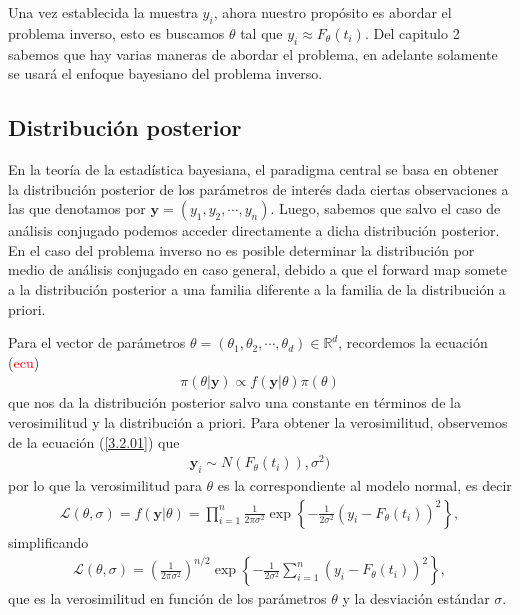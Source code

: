 Una vez establecida la muestra $y_i$, ahora nuestro propósito es abordar el problema inverso, esto es buscamos $\theta$ tal que $y_i \approx F_{\theta}(t_i)$. Del capitulo 2 sabemos que hay varias maneras de abordar el problema, en adelante solamente se usará el enfoque bayesiano del problema inverso.

\subsection{Distribución posterior}

En la teoría de la estadística bayesiana, el paradigma central se basa en obtener la distribución posterior de los parámetros de interés dada ciertas observaciones a las que denotamos por $\mathbf{y} = (y_1,y_2,\cdots, y_n)$. Luego, sabemos que salvo el caso de análisis conjugado podemos acceder directamente a dicha distribución posterior. En el caso del problema inverso no es posible determinar la distribución por medio de análisis conjugado en caso general, debido a que el forward map somete a la distribución posterior a una familia diferente a la familia de la distribución a priori.

Para el vector de parámetros $\theta = (\theta_1,\theta_2, \cdots, \theta_d) \in \mathbb{R}^d$, recordemos la ecuación (\textcolor{red}{ecu}) 
\begin{align}
    \pi(\theta|\mathbf{y}) \propto f(\mathbf{y}|\theta) \pi(\theta)
    \label{3.2.1.01}
\end{align} 
que nos da la distribución posterior salvo una constante en términos de la verosimilitud y la distribución a priori. Para obtener la verosimilitud, observemos de la ecuación (\ref{3.2.01}) que 
\begin{align*}
    \mathbf{y}_i \sim N(F_{\theta}(t_i)), \sigma^2)
\end{align*}
por lo que la verosimilitud para $\theta$ es la correspondiente al modelo normal, es decir
\begin{align}
    \mathcal{L} (\theta,\sigma) = f(\mathbf{y}|\theta) = \prod_{i = 1}^{n} \frac{1}{2\pi \sigma^2} \exp \left \{ -\frac{1}{2\sigma^2}\left(y_i - F_{\theta}(t_i)\right)^2 \right \} ,
\end{align}
simplificando
\begin{align}
    \mathcal{L}(\theta,\sigma) = \left(\frac{1}{2\pi \sigma^2}\right) ^{n/2}\exp \left \{  -\frac{1}{2\sigma^2}\sum_{i = 1}^{n} \left(y_i - F_{\theta}(t_i)\right)^2 \right \},
    \label{3.2.1.02}
\end{align}
que es la verosimilitud en función de los parámetros $\theta$ y la desviación estándar $\sigma$. 


